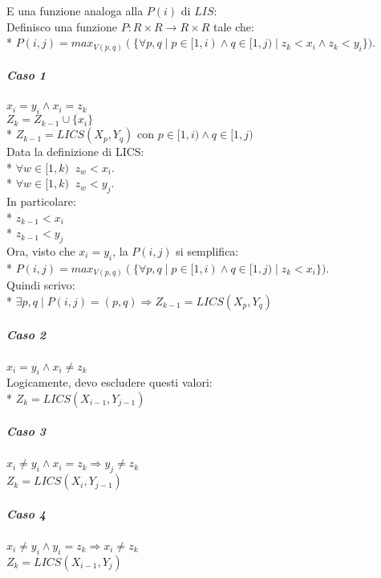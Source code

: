 E una funzione analoga alla $P(i)$ di $LIS$: \\

Definisco una funzione $P : R \times R \rightarrow R \times R$ tale che: \\*
$P(i, j) = max_{V(p, q)}(\{ \forall p,q \mid p \in [1, i) \land q \in [1, j) \mid z_{k} < x_i \land z_{k} < y_i\})$. \\

\subparagraph{Caso 1}

$x_i = y_i \land x_i = z_k$ \\

$Z_k = Z_{k-1} \cup \{x_i\}$ \\*
$Z_{k-1} = LICS(X_p, Y_q)$ con $p \in [1, i) \land q \in [1, j)$ \\

Data la definizione di LICS: \\*
$\forall w \in [1, k) \;\; z_{w} < x_i$. \\*
$\forall w \in [1, k) \;\; z_{w} < y_j$. \\

In particolare: \\*
$z_{k-1} < x_i$ \\*
$z_{k-1} < y_j$ \\

Ora, visto che $x_i = y_i$, la $P(i, j)$ si semplifica: \\*
$P(i, j) = max_{V(p, q)}(\{ \forall p,q \mid p \in [1, i) \land q \in [1, j) \mid z_{k} < x_i\})$. \\

Quindi scrivo: \\*
$\exists p,q \mid P(i, j) = (p, q) \Rightarrow Z_{k-1} = LICS(X_p, Y_q)$ \\

\subparagraph{Caso 2}

$x_i = y_i \land x_i \ne z_k$ \\

Logicamente, devo escludere questi valori: \\*
$Z_k = LICS(X_{i-1}, Y_{j-1})$ \\

\subparagraph{Caso 3}

$x_i \ne y_i \land x_i = z_k \Rightarrow y_j \ne z_k$ \\
$Z_k = LICS(X_{i}, Y_{j-1})$ \\

\subparagraph{Caso 4}

$x_i \ne y_i \land y_i = z_k \Rightarrow x_i \ne z_k$ \\
$Z_k = LICS(X_{i-1}, Y_{j})$ \\

